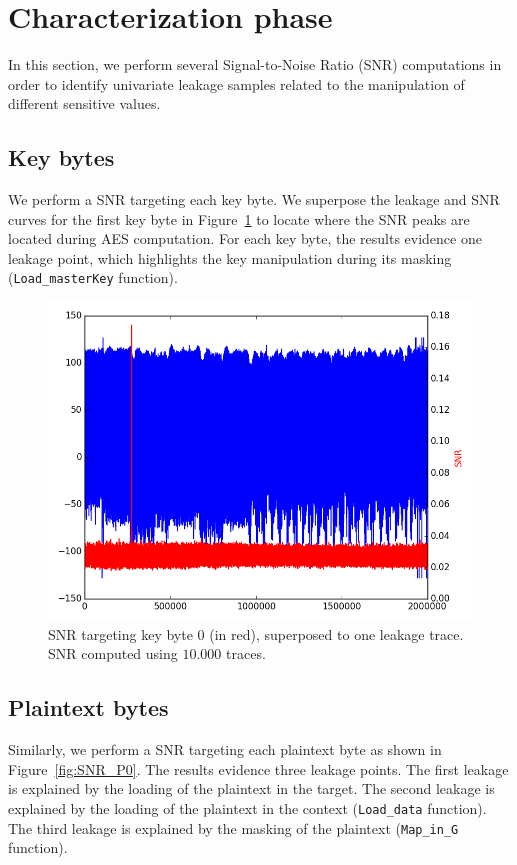\section{Characterization phase}
In this section, we perform several Signal-to-Noise Ratio (SNR) computations in order to identify univariate leakage samples related to the manipulation of different sensitive values.

\subsection{Key bytes}
We perform a SNR targeting each key byte.
We superpose the leakage and SNR curves for the first key byte in Figure~\ref{fig:SNR_K0} to locate where the SNR peaks are located during AES computation.
For each key byte, the results evidence one leakage point, which highlights the key manipulation during its masking (\texttt{Load\_masterKey} function).

\begin{figure}[H]
	\centering 
	\includegraphics[scale=0.35]{figures/2Mpts/SNRK0_10ktraces.png}
	\caption{SNR targeting key byte 0 (in red), superposed to one leakage trace. SNR computed using $10.000$ traces.}
	\label{fig:SNR_K0}
\end{figure}

\subsection{Plaintext bytes}
Similarly, we perform a SNR targeting each plaintext byte as shown in Figure~\ref{fig:SNR_P0}. 
The results evidence three leakage points. The first leakage is explained by the loading of the plaintext in the target.
The second leakage is explained by the loading of the plaintext in the context (\texttt{Load\_data} function).
The third leakage is explained by the masking of the plaintext (\texttt{Map\_in\_G} function).

